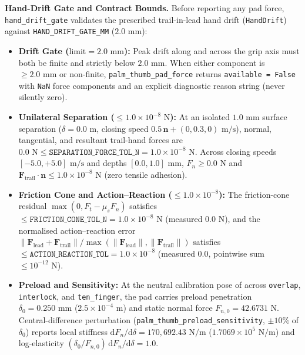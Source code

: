\documentclass[11pt,a4paper]{article}
\begin{document}
\textbf{Hand-Drift Gate and Contract Bounds.} Before reporting any pad force, \texttt{hand\_drift\_gate} validates the prescribed trail-in-lead hand drift (\texttt{HandDrift}) against \texttt{HAND\_DRIFT\_GATE\_MM} ($2.0\text{ mm}$):
\begin{itemize}[leftmargin=*,noitemsep]
\item \textbf{Drift Gate ($\text{limit} = 2.0\text{ mm}$):} Peak drift along and across the grip axis must both be finite and strictly below $2.0\text{ mm}$. When either component is $\ge 2.0\text{ mm}$ or non-finite, \texttt{palm\_thumb\_pad\_force} returns \texttt{available = False} with \texttt{NaN} force components and an explicit diagnostic reason string (never silently zero).
\item \textbf{Unilateral Separation ($\le 1.0\times 10^{-8}\text{ N}$):} At an isolated $1.0\text{ mm}$ surface separation ($\delta = 0.0\text{ m}$, closing speed $0.5\,\mathbf{n} + (0, 0.3, 0)\text{ m/s}$), normal, tangential, and resultant trail-hand forces are $0.0\text{ N} \le \texttt{SEPARATION\_FORCE\_TOL\_N} = 1.0\times 10^{-8}\text{ N}$. Across closing speeds $[-5.0, +5.0]\text{ m/s}$ and depths $[0.0, 1.0]\text{ mm}$, $F_n \ge 0.0\text{ N}$ and $\mathbf{F}_{\mathrm{trail}}\cdot\mathbf{n} \le 1.0\times 10^{-8}\text{ N}$ (zero tensile adhesion).
\item \textbf{Friction Cone and Action--Reaction ($\le 1.0\times 10^{-8}$):} The friction-cone residual $\max(0, F_t - \mu_s F_n)$ satisfies $\le \texttt{FRICTION\_CONE\_TOL\_N} = 1.0\times 10^{-8}\text{ N}$ (measured $0.0\text{ N}$), and the normalised action--reaction error $\|\mathbf{F}_{\mathrm{lead}} + \mathbf{F}_{\mathrm{trail}}\| / \max(\|\mathbf{F}_{\mathrm{lead}}\|, \|\mathbf{F}_{\mathrm{trail}}\|)$ satisfies $\le \texttt{ACTION\_REACTION\_TOL} = 1.0\times 10^{-8}$ (measured $0.0$, pointwise sum $\le 10^{-12}\text{ N}$).
\item \textbf{Preload and Sensitivity:} At the neutral calibration pose of  across \texttt{overlap}, \texttt{interlock}, and \texttt{ten\_finger}, the pad carries preload penetration $\delta_0 = 0.250\text{ mm}$ ($2.5\times 10^{-4}\text{ m}$) and static normal force $F_{n,0} = 42.6731\text{ N}$. Central-difference perturbation (\texttt{palm\_thumb\_preload\_sensitivity}, $\pm 10\%$ of $\delta_0$) reports local stiffness $\mathrm{d}F_n/\mathrm{d}\delta = 170,692.43\text{ N/m}$ ($1.7069\times 10^{5}\text{ N/m}$) and log-elasticity $(\delta_0/F_{n,0})\,\mathrm{d}F_n/\mathrm{d}\delta = 1.0$.

\end{itemize}
\end{document}

